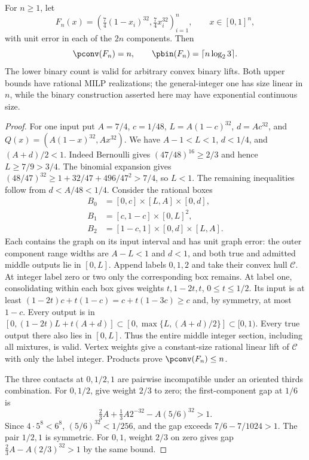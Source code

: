 \begin{theorem}\label{thm:exact-box-gap}
For $n\ge1$, let
\[
 F_n(x)=\left(\tfrac74(1-x_i)^{32},\tfrac74x_i^{32}\right)_{i=1}^n,
 \qquad x\in[0,1]^n,
\]
with unit error in each of the $2n$ components. Then
\begin{equation}\label{eq:exact-box-counts}
 \pconv(F_n)=n,\qquad \pbin(F_n)=\lceil n\log_2 3\rceil.
\end{equation}
The lower binary count is valid for arbitrary convex binary lifts.
Both upper bounds have rational MILP realizations; the general-integer
one has size linear in $n$, while the binary construction asserted here
may have exponential continuous size.
\end{theorem}
\begin{proof}
For one input put $A=7/4$, $c=1/48$, $L=A(1-c)^{32}$,
$d=Ac^{32}$, and $Q(x)=(A(1-x)^{32},Ax^{32})$.
We have $A-1<L<1$, $d<1/4$, and $(A+d)/2<1$.
Indeed Bernoulli gives $(47/48)^{16}\ge2/3$ and hence
$L\ge7/9>3/4$. The binomial expansion gives
$(48/47)^{32}\ge1+32/47+496/47^2>7/4$, so $L<1$.
The remaining inequalities follow from $d<A/48<1/4$.
Consider the rational boxes
\begin{align*}
 B_0&=[0,c]\times[L,A]\times[0,d],\\
 B_1&=[c,1-c]\times[0,L]^2,\\
 B_2&=[1-c,1]\times[0,d]\times[L,A].
\end{align*}
Each contains the graph on its input interval and has unit graph error:
the outer component range widths are $A-L<1$ and $d<1$, and both
true and admitted middle outputs lie in $[0,L]$.
Append labels $0,1,2$ and take their convex hull $\mathcal C$.
At integer label zero or two only the corresponding box remains.
At label one, consolidating within each box gives weights
$t,1-2t,t$, $0\le t\le1/2$. Its input is at least
$(1-2t)c+t(1-c)=c+t(1-3c)\ge c$ and, by symmetry, at most $1-c$.
Every output is in
$[0,(1-2t)L+t(A+d)]\subset[0,\max\{L,(A+d)/2\}]\subset[0,1)$.
Every true output there also lies in $[0,L]$. Thus the entire middle
integer section, including all mixtures, is valid. Vertex weights give
a constant-size rational linear lift of $\mathcal C$ with only the
label integer. Products prove $\pconv(F_n)\le n$.

The three contacts at $0,1/2,1$ are pairwise incompatible under an
oriented thirds combination. For $0,1/2$, give weight $2/3$ to zero;
the first-component gap at $1/6$ is
\[
 \tfrac23A+\tfrac13A2^{-32}-A(5/6)^{32}>1.
\]
Since $4\cdot5^8<6^8$, $(5/6)^{32}<1/256$, and the gap exceeds
$7/6-7/1024>1$. The pair $1/2,1$ is symmetric. For $0,1$, weight
$2/3$ on zero gives gap $\tfrac23A-A(2/3)^{32}>1$ by the same bound.


\end{proof}
